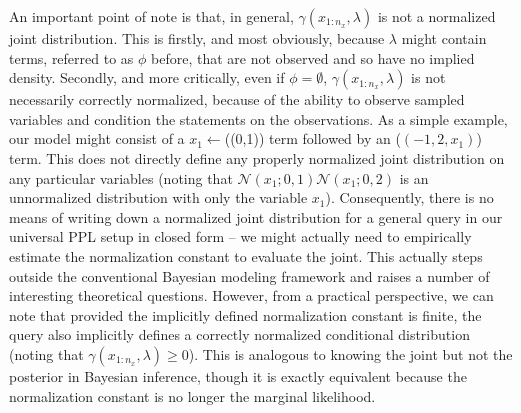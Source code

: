 An important point of note is that, in general, $\gamma(x_{1:n_x}, \lambda)$ is not a normalized joint distribution.  This is firstly,
and most obviously, because $\lambda$ might contain terms, referred to as $\phi$ before, that are not
observed and so have no implied density.  Secondly, and more critically, even if $\phi = \emptyset$,
$\gamma(x_{1:n_x}, \lambda)$ is not necessarily correctly normalized, because of the ability to observe sampled variables and
condition the \sample statements on the observations.  As a simple example, our model
might consist of a $x_1 \leftarrow$\sample(\normal(0,1)) term followed by an \observe(\normal$(-1,2,x_1)$)
term.  This does not directly define any properly normalized joint distribution on any particular variables
(noting that $\mathcal{N}(x_1;0,1) \mathcal{N}(x_1;0,2)$ is an unnormalized distribution with only the variable
$x_1$).  Consequently, there is no means of writing down a normalized joint distribution for a general
query in our universal PPL setup in closed form -- we might actually need to empirically estimate
the normalization constant to evaluate the joint.  This actually steps outside the conventional Bayesian
modeling framework and raises a number of interesting theoretical questions.  However, from a
practical perspective, we can note that provided the implicitly defined normalization constant is finite,
the query also implicitly defines a correctly normalized conditional distribution (noting that
$\gamma(x_{1:n_x}, \lambda) \ge0$).
This is analogous to knowing the joint but not the posterior in Bayesian inference, though it is exactly
equivalent because the normalization constant is no longer the marginal likelihood.

